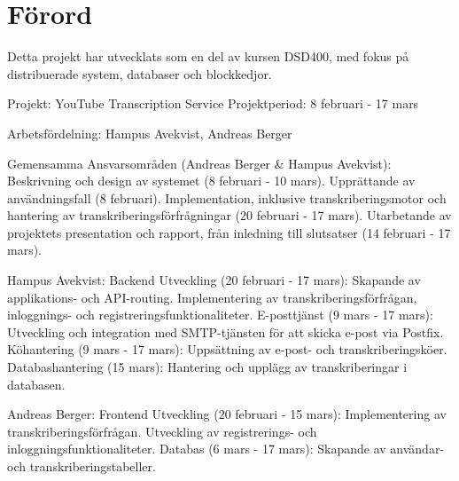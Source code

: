\thispagestyle{plain}

\section{Förord}
Detta projekt har utvecklats som en del av kursen DSD400, med fokus på distribuerade system, databaser och blockkedjor.

Projekt: YouTube Transcription Service
Projektperiod: 8 februari - 17 mars

Arbetsfördelning:
Hampus Avekvist, Andreas Berger

Gemensamma Ansvarsområden (Andreas Berger & Hampus Avekvist):
Beskrivning och design av systemet (8 februari - 10 mars).
Upprättande av användningsfall (8 februari).
Implementation, inklusive transkriberingsmotor och hantering av transkriberingsförfrågningar (20 februari - 17 mars).
Utarbetande av projektets presentation och rapport, från inledning till slutsatser (14 februari - 17 mars).

Hampus Avekvist:
Backend Utveckling (20 februari - 17 mars):
Skapande av applikations- och API-routing.
Implementering av transkriberingsförfrågan, inloggnings- och registreringsfunktionaliteter.
E-posttjänst (9 mars - 17 mars):
Utveckling och integration med SMTP-tjänsten för att skicka e-post via Postfix.
Köhantering (9 mars - 17 mars):
Uppsättning av e-post- och transkriberingsköer.
Databashantering (15 mars):
Hantering och upplägg av transkriberingar i databasen.

Andreas Berger:
Frontend Utveckling (20 februari - 15 mars):
Implementering av transkriberingsförfrågan.
Utveckling av registrerings- och inloggningsfunktionaliteter.
Databas (6 mars - 17 mars):
Skapande av användar- och transkriberingstabeller.